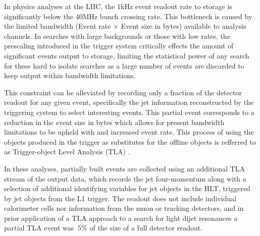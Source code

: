 	In physics analyses at the LHC, the $1$kHz event readout rate to storage is significantly below the $40$MHz bunch crossing rate. This bottleneck is caused by the limited bandwidth (Event rate $\times$ Event size in bytes) available to analysis channels. In searches with large backgrounds or those with low rates, the prescaling introduced in the trigger system critically effects the amount of significant events output to storage, limiting the statistical power of any search for these hard to isolate searches as a large number of events are discarded to keep output within bandwidth limitations.

	This constraint can be alleviated by recording only a fraction of the detector readout for any given event, specifically the jet information reconstructed by the triggering system to select interesting events. This partial event corresponds to a reduction in the event size in bytes which allows for present bandwidth limitations to be upheld with and increased event rate. This process of using the objects produced in the trigger as substitutes for the offline objects is refferred to as Trigger-object Level Analysis (TLA) \cite{tla}.

	In these analyses, partially built events are collected using an additional TLA stream of the output data, which records the jet four-momentum along with a selection of additional identifying variables for jet objects in the HLT, triggered by jet objects from the L1 trigger. The readout does not include individual calorimeter cells nor information from the muon or tracking detectors, and in prior application of a TLA approach to a search for light dijet resonances \cite{tla} a partial TLA event was $~5\%$ of the size of a full detector readout.




\endinput
